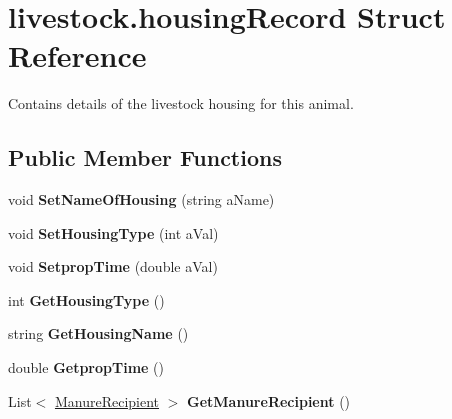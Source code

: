 \hypertarget{structlivestock_1_1housing_record}{}\section{livestock.\+housing\+Record Struct Reference}
\label{structlivestock_1_1housing_record}


Contains details of the livestock housing for this animal.  


\subsection*{Public Member Functions}
\begin{DoxyCompactItemize}
\item 
\mbox{\label{structlivestock_1_1housing_record_a1584b585f3700377ed06cb5e199970f0}} 
void {\bfseries Set\+Name\+Of\+Housing} (string a\+Name)
\item 
\mbox{\label{structlivestock_1_1housing_record_ae8703e7b5e61aaecbe5098e01c000710}} 
void {\bfseries Set\+Housing\+Type} (int a\+Val)
\item 
\mbox{\label{structlivestock_1_1housing_record_a70d301e211d1336e5248c9e45a896295}} 
void {\bfseries Setprop\+Time} (double a\+Val)
\item 
\mbox{\label{structlivestock_1_1housing_record_a0b5101b80fc1282f44ced192e88f5efa}} 
int {\bfseries Get\+Housing\+Type} ()
\item 
\mbox{\label{structlivestock_1_1housing_record_a776bdf58427bb435133756bbfa7f5a95}} 
string {\bfseries Get\+Housing\+Name} ()
\item 
\mbox{\label{structlivestock_1_1housing_record_a64e33341781a02a312e434fd06ed49c2}} 
double {\bfseries Getprop\+Time} ()
\item 
\mbox{\label{structlivestock_1_1housing_record_a1b462d25daa74854b8da6f06d2cf0b54}} 
List$<$ \mbox{\hyperlink{structlivestock_1_1_manure_recipient}{Manure\+Recipient}} $>$ {\bfseries Get\+Manure\+Recipient} ()

\end{DoxyCompactItemize}
